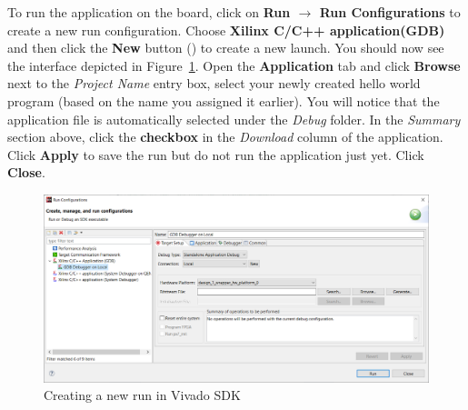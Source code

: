 \documentclass[11pt]{article}
\begin{document}
To run the application on the board, click on \textbf{Run $\rightarrow$ Run Configurations} to create a new run configuration. Choose \textbf{Xilinx C/C++ application(GDB)} and then click the \textbf{New} button
()
to create a new launch. You should now see the interface depicted in Figure~\ref{fig:new_run_config}. Open the \textbf{Application} tab and click \textbf{Browse} next to the \textit{Project Name} entry box, select your newly created hello world program (based on the name you assigned it earlier). You will notice that the application file is automatically selected under the \textit{Debug} folder. In the \textit{Summary} section above, click the \textbf{checkbox} in the \textit{Download} column of the application. Click \textbf{Apply} to save the run but do not run the application just yet. Click \textbf{Close}.

\begin{figure}[!h]
    \centering
    \includegraphics[width=\textwidth]{images/new_run_config.png}
    \caption{Creating a new run in Vivado SDK}
    \label{fig:new_run_config}
\end{figure}
\end{document}
